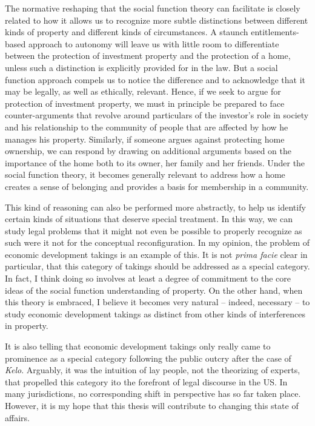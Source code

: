The normative reshaping that the social function theory can facilitate is closely related to how it allows us to recognize more subtle distinctions between different kinds of property and different kinds of circumstances. A staunch entitlements-based approach to autonomy will leave us with little room to differentiate between the protection of investment property and the protection of a home, unless such a distinction is explicitly provided for in the law. But a social function approach compels us to notice the difference and to acknowledge that it may be legally, as well as ethically, relevant. Hence, if we seek to argue for protection of investment property, we must in principle be prepared to face counter-arguments that revolve around particulars of the investor's role in society and his relationship to the community of people that are affected by how he manages his property. Similarly, if someone argues against protecting home ownership, we can respond by drawing on additional arguments based on the importance of the home both to its owner, her family and her friends. Under the social function theory, it becomes generally relevant to address how a home creates a sense of belonging and provides a basis for membership in a community.

This kind of reasoning can also be performed more abstractly, to help us identify certain kinds of situations that deserve special treatment. In this way, we can study legal problems that it might not even be possible to properly recognize as such were it not for the conceptual reconfiguration. In my opinion, the problem of economic development takings is an example of this. It is not {\it prima facie} clear in particular, that this category of takings should be addressed as a special category. In fact, I think doing so involves at least a degree of commitment to the core ideas of the social function understanding of property. On the other hand, when this theory is embraced, I believe it becomes very natural -- indeed, necessary -- to study economic development takings as distinct from other kinds of interferences in property. 

It is also telling that economic development takings only really came to prominence as a special category following the public outcry after the case of {\it Kelo}. Arguably, it was the intuition of lay people, not the theorizing of experts, that propelled this category ito the forefront of legal discourse in the US. In many jurisdictions, no corresponding shift in perspective has so far taken place. However, it is my hope that this thesis will contribute to changing this state of affairs.

